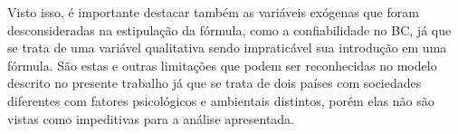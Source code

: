  Visto isso, \'{e} importante destacar tamb\'{e}m as vari\'{a}veis ex\'{o}genas que foram desconsideradas na estipula\c{c}\~{a}o da f\'{o}rmula, como a confiabilidade no BC, j\'{a} que se trata de uma vari\'{a}vel qualitativa sendo impratic\'{a}vel sua introdu\c{c}\~{a}o em uma f\'{o}rmula. S\~{a}o estas e outras limita\c{c}\~{o}es que podem ser reconhecidas no modelo descrito no presente trabalho j\'{a} que se trata de dois pa\'{i}ses com sociedades diferentes com fatores psicol\'{o}gicos e ambientais distintos, por\'{e}m elas n\~{a}o s\~{a}o vistas como impeditivas para a an\'{a}lise apresentada. 
